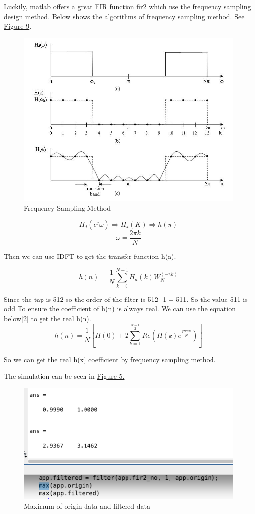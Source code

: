 \documentclass[titlepage]{article}
\begin{document}
Luckily, matlab offers a great FIR function fir2 which use the frequency
sampling design method. Below shows the algorithms of frequency sampling
method. See \hyperref[fig:org92060a0]{Figure 9}.

\begin{figure}[htbp]
\caption{\label{fig:org92060a0}
Frequency Sampling Method}
\centering
\includegraphics[width=12cm]{./img/14.jpg}
\end{figure}

$$ H_d(e^j\omega) \Rightarrow H_d(K) \Rightarrow h(n) $$
$$ \omega = \frac{2{\pi}k}{N} $$

Then we can use IDFT to get the transfer function h(n).

$$ h(n) = \frac{1}{N}\sum_{k=0}^{N-1}H_d(k)W_N^{(-nk)}$$

  Since the tap is 512 so the order of the filter is 512 -1 = 511. So the value
511 is odd To ensure the coefficient of h(n) is always real. We can use the
equation below[2] to get the real h(n).
$$ h(n) = \frac{1}{N}[H(0) + 2\sum_{k=1}^{\frac{N-1}{2}}Re(H(k)e^\frac{j2{\pi}an}{N})] $$

So we can get the real h(x) coefficient by frequency sampling method.

The simulation can be seen in \hyperref[fig:org146612e]{Figure 5.}

\begin{figure}[htbp]
\caption{\label{fig:org3c5c511}
Maximum of origin data and filtered data}
\centering
\includegraphics[width=12cm]{./img/9.png}
\end{figure}
\end{document}
